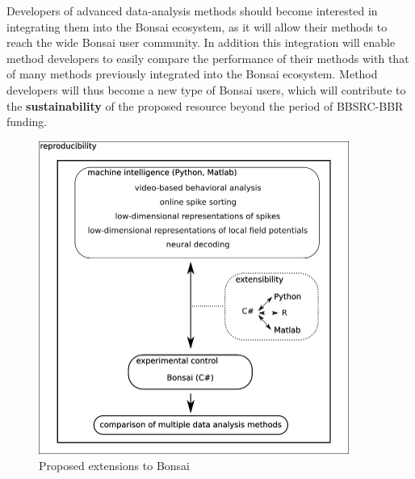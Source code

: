Developers of advanced data-analysis methods should become interested in
integrating them into the Bonsai ecosystem, as it will allow their methods to
reach the wide Bonsai user community. In addition this integration will enable
method developers to easily compare the performance of their methods with
that of many methods previously integrated into the Bonsai ecosystem. Method
developers will thus become a new type of Bonsai users, which will contribute
to the \textbf{sustainability} of the proposed resource beyond the period of
BBSRC-BBR funding.


\begin{figure}
  \includegraphics[width=4in]{figures/proposed_bonsai_extensions.png}
  \caption{Proposed extensions to Bonsai}
  \label{fig:proposedBonsaiExtensions}
\end{figure}


